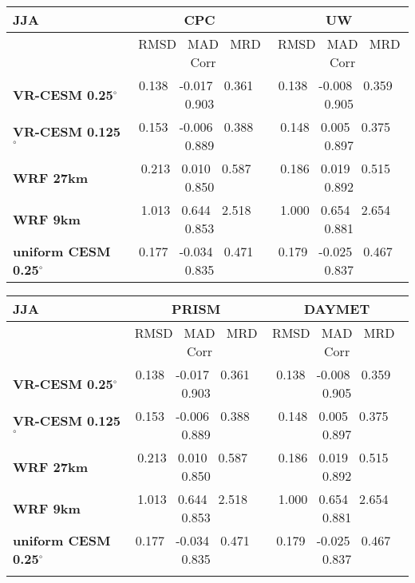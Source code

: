 \documentclass[ms]{agutexSI}
\begin{document}
\begin{table}
\begin{center}
\begin{tabular}{lcc}
\hline \textbf{JJA} & \textbf{CPC}  & \textbf{UW} \\
\hline $    $ & RMSD $\ $ MAD $\ $ MRD $\ $ Corr & RMSD $\ $ MAD $\ $ MRD $\ $ Corr \\
\hline \textbf{VR-CESM 0.25$^\circ$} & 0.138 $\ $ -0.017 $\ $ 0.361 $\ $ 0.903 & 0.138 $\ $ -0.008 $\ $ 0.359 $\ $ 0.905 \\
\textbf{VR-CESM 0.125$^\circ$} & 0.153 $\ $ -0.006 $\ $ 0.388 $\ $ 0.889 & 0.148 $\ $ 0.005 $\ $ 0.375 $\ $ 0.897 \\
\textbf{WRF 27km} & 0.213 $\ $ 0.010 $\ $ 0.587 $\ $ 0.850 & 0.186 $\ $ 0.019 $\ $ 0.515 $\ $ 0.892 \\
\textbf{WRF 9km} & 1.013 $\ $ 0.644 $\ $ 2.518 $\ $ 0.853 & 1.000 $\ $ 0.654 $\ $ 2.654 $\ $ 0.881 \\
\textbf{uniform CESM 0.25$^\circ$} & 0.177 $\ $ -0.034 $\ $ 0.471 $\ $ 0.835 & 0.179 $\ $ -0.025 $\ $ 0.467 $\ $ 0.837 \\
\hline
\end{tabular}

\begin{tabular}{lcc}
\hline \textbf{JJA} & \textbf{PRISM} & \textbf{DAYMET} \\
\hline $    $ & RMSD $\ $ MAD $\ $ MRD $\ $ Corr & RMSD $\ $ MAD $\ $ MRD $\ $ Corr  \\
\hline \textbf{VR-CESM 0.25$^\circ$} & 0.138 $\ $ -0.017 $\ $ 0.361 $\ $ 0.903 & 0.138 $\ $ -0.008 $\ $ 0.359 $\ $ 0.905 \\
\textbf{VR-CESM 0.125$^\circ$} & 0.153 $\ $ -0.006 $\ $ 0.388 $\ $ 0.889 & 0.148 $\ $ 0.005 $\ $ 0.375 $\ $ 0.897 \\
\textbf{WRF 27km} & 0.213 $\ $ 0.010 $\ $ 0.587 $\ $ 0.850 & 0.186 $\ $ 0.019 $\ $ 0.515 $\ $ 0.892 \\
\textbf{WRF 9km} & 1.013 $\ $ 0.644 $\ $ 2.518 $\ $ 0.853 & 1.000 $\ $ 0.654 $\ $ 2.654 $\ $ 0.881 \\
\textbf{uniform CESM 0.25$^\circ$} & 0.177 $\ $ -0.034 $\ $ 0.471 $\ $ 0.835 & 0.179 $\ $ -0.025 $\ $ 0.467 $\ $ 0.837 \\
\hline
\\
\end{tabular}


\end{center}
\end{table}
\end{document}
